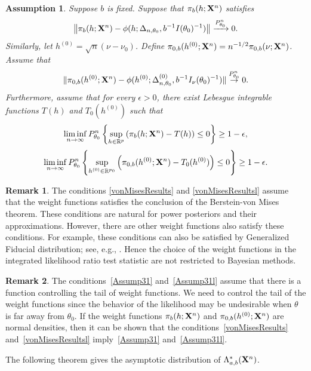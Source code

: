 \documentclass[11pt]{article}
\theoremstyle{plain}
\newtheorem{assumption}{\quad\quad Assumption}
\theoremstyle{definition}
\newtheorem{remark}{\quad\quad Remark}
\theoremstyle{remark}
\begin{document}
\begin{assumption}\label{Assumption3}
    Suppose $b$ is fixed.
    Suppose that $\pi_b(h;\mathbf{X}^{n})$ satisfies
        \begin{equation}\label{vonMisesResults}
            \left\|
            \pi_b(h;\mathbf{X}^{n})-\phi(h;\Delta_{n,\theta_0},b^{-1}I(\theta_0)^{-1})
            \right\|
            \xrightarrow{P_{\theta_0}^n} 0.
        \end{equation}
        Similarly, let $h^{(0)}=\sqrt{n}(\nu-\nu_0)$.
        Define $\pi_{0,b}(h^{(0)};\mathbf{X}^{n})=n^{-1/2}\pi_{0,b}(\nu;\mathbf{X}^{n})$. Assume that 
\begin{equation}\label{vonMisesResultsl}
    \|\pi_{0,b}(h^{(0)};\mathbf{X}^{n})-\phi(h^{(0)};\Delta^{(0)}_{n,\theta_0},b^{-1}I_{\nu}(\theta_0)^{-1})\|\overset{P_{\theta_0}^n}{\to}0.
\end{equation}
Furthermore, assume that for every $\epsilon>0$, there exist Lebesgue integrable functions $T(h)$ and $T_0(h^{(0)})$ such that 
    \begin{equation}\label{Assump31}
        \liminf_{n\to \infty}P_{\theta_0}^n\left\{\sup_{h\in \mathbb{R}^p}\left(\pi_b(h;\mathbf{X}^{n})-T(h)\right)\leq 0\right\}\geq 1-\epsilon,
\end{equation}
    \begin{equation}\label{Assump31l}
        \liminf_{n\to \infty}P_{\theta_0}^n\left\{\sup_{h^{(0)}\in \mathbb{R}^{p_0}}\left(\pi_{0,b}(h^{(0)};\mathbf{X}^{n})-T_0(h^{(0)})\right)\leq 0\right\}\geq 1-\epsilon.
\end{equation}


\end{assumption}
\begin{remark}
    The conditions \eqref{vonMisesResults} and \eqref{vonMisesResultsl} assume that the weight functions satisfies the conclusion of the Berstein-von Mises theorem.
    These conditions are natural for power posteriors and their approximations.
    However, there are other weight functions also satisfy these conditions.
    For example, these conditions can also be satisfied by Generalized Fiducial distribution; see, e.g., \cite{Hannig2016}.
    Hence the choice of the weight functions in the integrated likelihood ratio test statistic are not restricted to Bayesian methods.
\end{remark}
\begin{remark}
The conditions~\eqref{Assump31} and~\eqref{Assump31l} assume that there is a function controlling the tail of weight functions.
We need to control the tail of the weight functions since the behavior of the likelihood may be undesirable when $\theta$ is far away from $\theta_0$.
If the weight functions $\pi_b(h;\mathbf{X}^{n})$ and $\pi_{0,b}(h^{(0)} ; \mathbf{X}^n )$ are normal densities, then it can be shown that the conditions~\eqref{vonMisesResults} and~\eqref{vonMisesResultsl} imply~\eqref{Assump31} and~\eqref{Assump31l}.
\end{remark}
The following theorem gives the asymptotic distribution of $\Lambda_{a,b}^* (\mathbf{X}^n)$.
\end{document}
